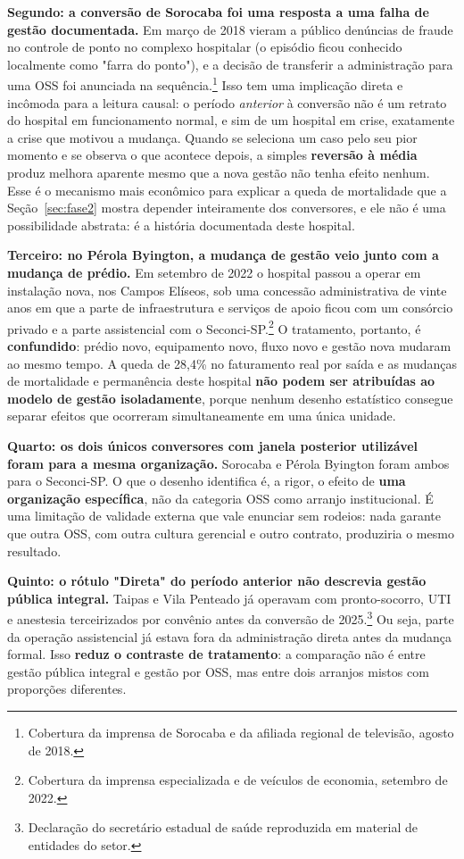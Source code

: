 \textbf{Segundo: a conversão de Sorocaba foi uma resposta a uma falha de
gestão documentada.} Em março de 2018 vieram a público denúncias de
fraude no controle de ponto no complexo hospitalar (o episódio ficou
conhecido localmente como "farra do ponto"), e a decisão de transferir
a administração para uma OSS foi anunciada na sequência.\footnote{Cobertura
da imprensa de Sorocaba e da afiliada regional de televisão, agosto de
2018.} Isso tem uma implicação direta e incômoda para a leitura causal:
o período \emph{anterior} à conversão não é um retrato do hospital em
funcionamento normal, e sim de um hospital em crise, exatamente a
crise que motivou a mudança. Quando se seleciona um caso pelo seu pior
momento e se observa o que acontece depois, a simples \textbf{reversão à
média} produz melhora aparente mesmo que a nova gestão não tenha efeito
nenhum. Esse é o mecanismo mais econômico para explicar a queda de
mortalidade que a Seção~\ref{sec:fase2} mostra depender inteiramente dos
conversores, e ele não é uma possibilidade abstrata: é a história
documentada deste hospital.

\newpage
\textbf{Terceiro: no Pérola Byington, a mudança de gestão veio junto com
a mudança de prédio.} Em setembro de 2022 o hospital passou a operar em
instalação nova, nos Campos Elíseos, sob uma concessão administrativa de
vinte anos em que a parte de infraestrutura e serviços de apoio ficou
com um consórcio privado e a parte assistencial com o
Seconci-SP.\footnote{Cobertura da imprensa especializada e de veículos de
economia, setembro de 2022.} O tratamento, portanto, é
\textbf{confundido}: prédio novo, equipamento novo, fluxo novo e gestão
nova mudaram ao mesmo tempo. A queda de 28,4\% no faturamento real por
saída e as mudanças de mortalidade e permanência deste hospital
\textbf{não podem ser atribuídas ao modelo de gestão isoladamente},
porque nenhum desenho estatístico consegue separar efeitos que ocorreram
simultaneamente em uma única unidade.

\textbf{Quarto: os dois únicos conversores com janela posterior
utilizável foram para a mesma organização.} Sorocaba e Pérola Byington
foram ambos para o Seconci-SP. O que o desenho identifica é, a rigor, o
efeito de \textbf{uma organização específica}, não da categoria OSS como
arranjo institucional. É uma limitação de validade externa que vale
enunciar sem rodeios: nada garante que outra OSS, com outra cultura
gerencial e outro contrato, produziria o mesmo resultado.

\textbf{Quinto: o rótulo "Direta" do período anterior não descrevia
gestão pública integral.} Taipas e Vila Penteado já operavam com pronto-socorro,
UTI e anestesia terceirizados por convênio antes da conversão de
2025.\footnote{Declaração do secretário estadual de saúde reproduzida em
material de entidades do setor.} Ou seja, parte da operação assistencial
já estava fora da administração direta antes da mudança formal. Isso
\textbf{reduz o contraste de tratamento}: a comparação não é entre gestão
pública integral e gestão por OSS, mas entre dois arranjos mistos com
proporções diferentes.

